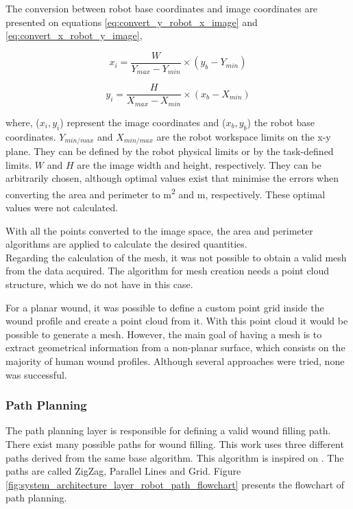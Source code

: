 The conversion between robot base coordinates and image coordinates are presented on equations \ref{eq:convert_y_robot_x_image} and \ref{eq:convert_x_robot_y_image},

\begin{equation}
\label{eq:convert_y_robot_x_image}
    x_i = \frac{W}{Y_{max} - Y_{min}} \times (y_b - Y_{min})
\end{equation}

\begin{equation}
\label{eq:convert_x_robot_y_image}
    y_i = \frac{H}{X_{max} - X_{min}} \times (x_b - X_{min})
\end{equation}

where, ($x_i, y_i$) represent the image coordinates and ($x_b, y_b$) the robot base coordinates. $Y_{min/max}$ and $X_{min/max}$ are the robot workspace limits on the x-y plane. They can be defined by the robot physical limits or by the task-defined limits. $W$ and $H$ are the image width and height, respectively. They can be arbitrarily chosen, although optimal values exist that minimise the errors when converting the area and perimeter to \si{\meter \squared} and \si{\meter}, respectively. These optimal values were not calculated.

With all the points converted to the image space, the area and perimeter algorithms are applied to calculate the desired quantities.\\

Regarding the calculation of the mesh, it was not possible to obtain a valid mesh from the data acquired. The algorithm for mesh creation needs a point cloud structure, which we do not have in this case.

For a planar wound, it was possible to define a custom point grid inside the wound profile and create a point cloud from it. With this point cloud it would be possible to generate a mesh. However, the main goal of having a mesh is to extract geometrical information from a non-planar surface, which consists on the majority of human wound profiles. Although several approaches were tried, none was successful.


\subsubsection*{Path Planning}
\label{subsubsec:system_architectural_robot_layers_path_planning}

The path planning layer is responsible for defining a valid wound filling path. There exist many possible paths for wound filling. This work uses three different paths derived from the same base algorithm. This algorithm is inspired on \cite{Ding2018_simulated_insitu_bioprinting_wound_bed_path_planning}. The paths are called ZigZag, Parallel Lines and Grid. Figure \ref{fig:system_architecture_layer_robot_path_flowchart} presents the flowchart of path planning.

